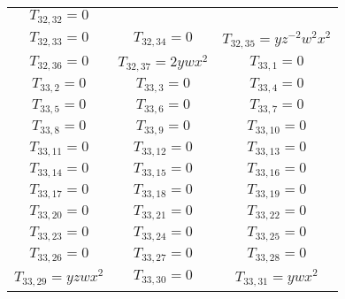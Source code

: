 \begin{longtable}{|c|c|c|}
$T_{32,32}= 0$\\

$T_{32,33}= 0$&

$T_{32,34}= 0$&

$T_{32,35}= yz^{-2}w^2x^2$\\

$T_{32,36}= 0$&

$T_{32,37}= 2ywx^2$&

$T_{33,1}= 0$\\

$T_{33,2}= 0$&

$T_{33,3}= 0$&

$T_{33,4}= 0$\\

$T_{33,5}= 0$&

$T_{33,6}= 0$&

$T_{33,7}= 0$\\

$T_{33,8}= 0$&

$T_{33,9}= 0$&

$T_{33,10}= 0$\\

$T_{33,11}= 0$&

$T_{33,12}= 0$&

$T_{33,13}= 0$\\

$T_{33,14}= 0$&

$T_{33,15}= 0$&

$T_{33,16}= 0$\\

$T_{33,17}= 0$&

$T_{33,18}= 0$&

$T_{33,19}= 0$\\

$T_{33,20}= 0$&

$T_{33,21}= 0$&

$T_{33,22}= 0$\\

$T_{33,23}= 0$&

$T_{33,24}= 0$&

$T_{33,25}= 0$\\

$T_{33,26}= 0$&

$T_{33,27}= 0$&

$T_{33,28}= 0$\\

$T_{33,29}= yzwx^2$&

$T_{33,30}= 0$&

$T_{33,31}= ywx^2$\\


\end{longtable}
